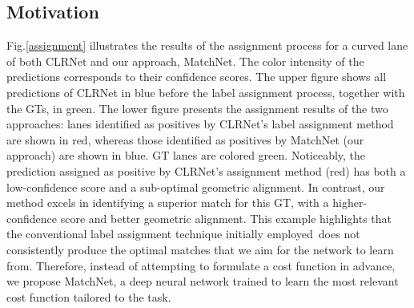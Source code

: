 \documentclass[10pt,twocolumn,letterpaper]{article}
\begin{document}
\subsection{Motivation}
Fig.\ref{assignment} illustrates the results of the assignment process for a curved lane of both CLRNet and our approach, MatchNet. The color intensity of the predictions corresponds to their confidence scores. The upper figure shows all  predictions of CLRNet in blue before the label assignment process, together with the GTs, in green. The lower figure presents the assignment results of the two approaches: lanes identified as positives by CLRNet's label assignment method are shown in red, whereas those identified as positives by MatchNet (our approach) are shown in blue. GT lanes are colored green. Noticeably, the prediction assigned as positive by CLRNet's assignment method (red) has both a low-confidence score and a sub-optimal geometric alignment. In contrast, our method excels in identifying a superior match for this GT, with a higher-confidence score and better geometric alignment. This example highlights that the conventional label assignment technique initially employed does not consistently produce the optimal matches that we aim for the network to learn from. Therefore, instead of attempting to formulate a cost function in advance, we propose MatchNet, a deep neural network trained to learn the most relevant cost function tailored to the task.
\end{document}
